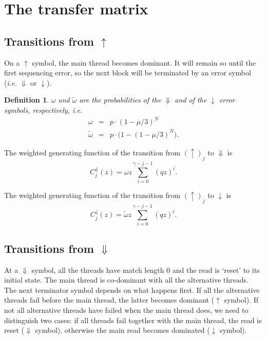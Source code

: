 \documentclass{article}
\newtheorem{definition}{Definition}
\begin{document}



\section{The transfer matrix}

\subsection{Transitions from $\uparrow$}
\label{sec:trans_from_up}

On a $\uparrow$ symbol, the main thread becomes dominant. It will remain
so until the first sequencing error, so the next block will be terminated
by an error symbol (\textit{i.e.} $\Downarrow$ or $\downarrow$).

\begin{definition}
$\omega$ and $\tilde{\omega}$ are the probabilities of the $\Downarrow$
and of the $\downarrow$ error symbols, respectively, \textit{i.e.}
\begin{eqnarray}
\omega &=& p \cdot (1-\mu/3)^N \\
\tilde{\omega} &=& p \cdot \big( 1-(1-\mu/3)^N \big).
\end{eqnarray}
\end{definition}

The weighted generating function of the transition from $(\uparrow)_j$ to
$\Downarrow$ is
\begin{equation}
C^\Downarrow_j(z) = \omega z \sum_{i=0}^{\gamma-j-1} (qz)^i.
\end{equation}

The weighted generating function of the transition from
$(\uparrow)_j$ to $\downarrow$ is
\begin{equation}
C^\downarrow_j(z) = \tilde{\omega} z
  \sum_{i=0}^{\gamma-j-1} (qz)^i.
\end{equation}


\subsection{Transitions from $\Downarrow$}
\label{sec:trans_from_Down}

At a $\Downarrow$ symbol, all the threads have match length $0$ and the
read is `reset' to its initial state. The main thread is co-dominant with
all the alternative threads. The next terminator symbol depends on what
happens first. If all the alternative threads fail before the main thread,
the latter becomes dominant ($\uparrow$ symbol). If not all alternative
threads have failed when the main thread does, we need to distinguish two
cases: if all threads fail together with the main thread, the read is
reset ($\Downarrow$ symbol), otherwise the main read becomes dominated
($\downarrow$ symbol).
\end{document}
